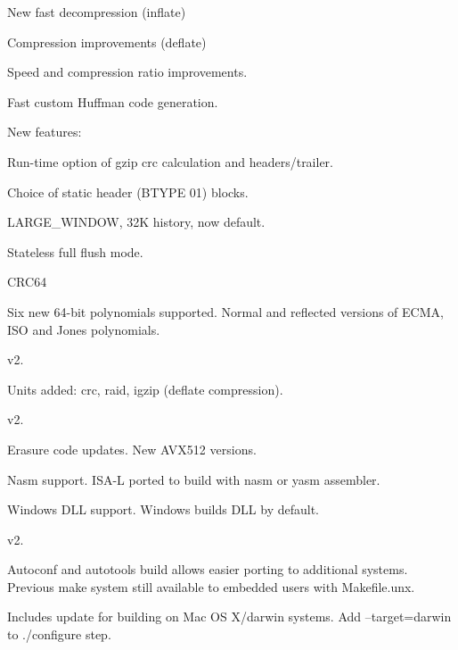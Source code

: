 \begin{DoxyItemize}
\item New fast decompression (inflate)
\item Compression improvements (deflate)
\begin{DoxyItemize}
\item Speed and compression ratio improvements.
\item Fast custom Huffman code generation.
\item New features\-:
\begin{DoxyItemize}
\item Run-\/time option of gzip crc calculation and headers/trailer.
\item Choice of static header (B\-T\-Y\-P\-E 01) blocks.
\item L\-A\-R\-G\-E\-\_\-\-W\-I\-N\-D\-O\-W, 32\-K history, now default.
\item Stateless full flush mode.
\end{DoxyItemize}
\end{DoxyItemize}
\item C\-R\-C64
\begin{DoxyItemize}
\item Six new 64-\/bit polynomials supported. Normal and reflected versions of E\-C\-M\-A, I\-S\-O and Jones polynomials.
\end{DoxyItemize}
\end{DoxyItemize}

v2.


\begin{DoxyItemize}
\item Units added\-: crc, raid, igzip (deflate compression).
\end{DoxyItemize}

v2.


\begin{DoxyItemize}
\item Erasure code updates. New A\-V\-X512 versions.
\item Nasm support. I\-S\-A-\/\-L ported to build with nasm or yasm assembler.
\item Windows D\-L\-L support. Windows builds D\-L\-L by default.
\end{DoxyItemize}

v2.


\begin{DoxyItemize}
\item Autoconf and autotools build allows easier porting to additional systems. Previous make system still available to embedded users with Makefile.\-unx.
\item Includes update for building on Mac O\-S X/darwin systems. Add --target=darwin to ./configure step.
\end{DoxyItemize}

